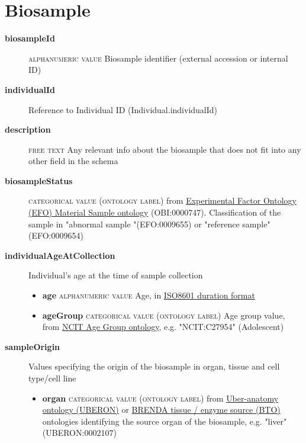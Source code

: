 \documentclass[a4paper, 10pt]{article}        %
\begin{document}
  
  \section*{ {\color{teal} Biosample}}
  
  \begin{description}
	\item[\textbf{biosampleId}]  {\textsc{alphanumeric value}} Biosample identifier (external accession or internal ID)
	\item[\textbf{individualId}] Reference to Individual ID (Individual.individualId)
	\item[\textbf{description}]  {\textsc{free text}} Any relevant info about the biosample that does not fit into any other field in the schema
	\item[\textbf{biosampleStatus}] {\textsc{categorical value (ontology label)}} from  \href{https://www.ebi.ac.uk/ols/ontologies/efo/terms?iri=http%3A%2F%2Fpurl.obolibrary.org%2Fobo%2FOBI_0000747&viewMode=All&siblings=false}{Experimental Factor Ontology (EFO) Material Sample ontology} (OBI:0000747). Classification of the sample in "abnormal sample "(EFO:0009655) or "reference sample" (EFO:0009654)
	\item[\textbf{individualAgeAtCollection}] Individual's age at the time of sample collection
	\begin{itemize}
			\item[] \textbf{age} {\textsc{alphanumeric value}} Age, in \href{https://www.iso.org/iso-8601-date-and-time-format.html}{ISO8601 duration format}  
			\item[] \textbf{ageGroup} {\textsc{categorical value (ontology label)}} Age group value, from \href{https://www.ebi.ac.uk/ols/ontologies/ncit/terms?iri=http%3A%2F%2Fpurl.obolibrary.org%2Fobo%2FNCIT_C20587}{NCIT Age Group ontology}, e.g. "NCIT:C27954" (Adolescent)
			\end{itemize}
	\item[\textbf{sampleOrigin}] Values specifying the origin of the biosample in organ, tissue and cell type/cell line
	\begin{itemize} 
	\item[]  \textbf{organ} {\textsc{categorical value (ontology label)}} from \href{https://www.ebi.ac.uk/ols/ontologies/uberon}{Uber-anatomy ontology (UBERON)} or \href{https://www.ebi.ac.uk/ols/ontologies/bto}{BRENDA tissue / enzyme source (BTO)} ontologies identifying the source organ of the biosample, e.g. "liver" (UBERON:0002107)

\end{itemize}
\end{description}
\end{document}
